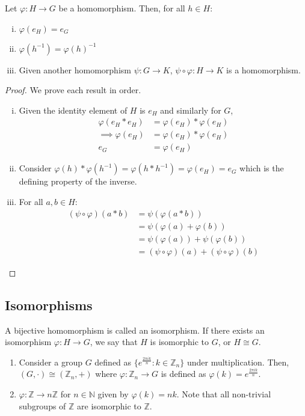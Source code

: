 \begin{proposition}
	Let \(\varphi: H \to G\) be a homomorphism.
	Then, for all \(h \in H\):
	\begin{enumerate}[i.]
		\item \(\varphi(e_H) = e_G\)
		\item \(\varphi(h^{-1}) = \varphi(h)^{-1}\)
		\item Given another homomorphism \(\psi: G \to K\), \(\psi \circ \varphi: H \to K\) is a homomorphism.
	\end{enumerate}
\end{proposition}
\begin{proof}
	We prove each result in order.
	\begin{enumerate}[i.]
		\item Given the identity element of \(H\) is \(e_H\) and similarly for \(G\),
		      \begin{align*}
			      \varphi(e_H \ast e_H) & = \varphi(e_H) \ast \varphi(e_H) \\
			      \implies \varphi(e_H) & = \varphi(e_H) \ast \varphi(e_H) \\
			      e_G                   & = \varphi(e_H)
		      \end{align*}
		\item Consider \(\varphi(h) \ast \varphi(h^{-1}) = \varphi(h \ast h^{-1}) = \varphi(e_H) = e_G\) which is the defining property of the inverse.
		\item For all \(a, b \in H\):
		      \begin{align*}
			      (\psi \circ \varphi) (a \ast b) & = \psi(\varphi(a \ast b))                           \\
			                                      & = \psi(\varphi(a) + \varphi(b))                     \\
			                                      & = \psi(\varphi(a)) + \psi(\varphi(b))               \\
			                                      & = (\psi \circ \varphi)(a) + (\psi \circ \varphi)(b)
		      \end{align*}
	\end{enumerate}
\end{proof}

\subsection{Isomorphisms}
A bijective homomorphism is called an isomorphism.
If there exists an isomorphism \(\varphi: H \to G\), we say that \(H\) is isomorphic to \(G\), or \(H \cong G\).
\begin{enumerate}
	\item Consider a group \(G\) defined as \(\{ e^{\frac{2 \pi i k}{n}} : k \in \mathbb Z_n \}\) under multiplication.
	      Then, \((G, \cdot) \cong (\mathbb Z_n, +)\) where \(\varphi: \mathbb Z_n \to G\) is defined as \(\varphi(k) = e^{\frac{2\pi i k}{n}}\).
	\item \(\varphi: \mathbb Z \to n\mathbb Z\) for \(n \in \mathbb N\) given by \(\varphi(k) = nk\).
	      Note that all non-trivial subgroups of \(\mathbb Z\) are isomorphic to \(\mathbb Z\).
\end{enumerate}

